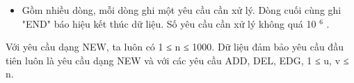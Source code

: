 \begin{itemize}
	\item     Gồm nhiều dòng, mỗi dòng ghi một yêu cầu cần xử lý. Dòng cuối cùng ghi "END" báo hiệu kết thúc dữ liệu. Số yêu cầu cần xử lý không quá 10    $^     6    $    .   
\end{itemize}

   Với yêu cầu dạng NEW, ta luôn có 1 ≤ n ≤ 1000. Dữ liệu đảm bảo yêu cầu đầu tiên luôn là yêu cầu dạng NEW và với các yêu cầu ADD, DEL, EDG, 1 ≤ u, v ≤ n.